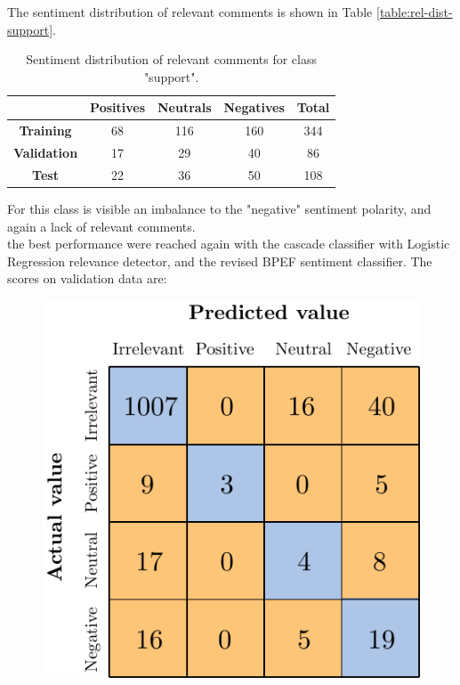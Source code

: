 The sentiment distribution of relevant comments is shown in Table \ref{table:rel-dist-support}.

\begin{table}[H]
	\centering
	\begin{tabular}{ | c  c  c c | c | } 
		\hline
		& \textbf{Positives} & \textbf{Neutrals} & \textbf{Negatives} & \textbf{Total} \\
		\hline
		\textbf{Training} & 68 & 116 & 160 & 344 \\ 
		\hline
		\textbf{Validation} & 17 & 29 & 40 & 86 \\ 
		\hline
		\textbf{Test} & 22 & 36 & 50 & 108 \\
		\hline
	\end{tabular}
	\label{table:snt-dist-support}
	\caption{Sentiment distribution of relevant comments for class "support".}
\end{table}

For this class is visible an imbalance to the "negative" sentiment polarity, and again a lack of relevant comments.\\
the best performance were reached again with the cascade classifier with Logistic Regression relevance detector, and the revised BPEF sentiment classifier. The scores on validation data are:

\begin{figure}[H]
	\centering
	\includegraphics[scale=1]{figures/conf_matrices/ita_support/ita_cascade_support_bpef_val.pdf}
	\label{fig:ita_cascade_support_bpef_val}
\end{figure}

